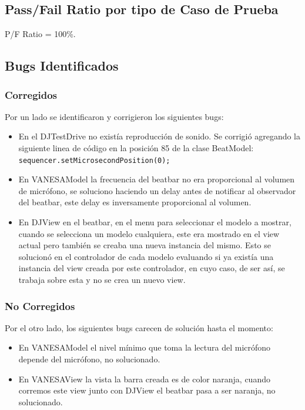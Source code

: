 \documentclass[10pt]{article} %
\begin{document}
\subsection{Pass/Fail Ratio por tipo de Caso de Prueba}
P/F Ratio = 100\%.

\subsection{Bugs Identificados}

\subsubsection{Corregidos}
Por un lado se identificaron y corrigieron los siguientes bugs:
\begin{itemize}
\item En el DJTestDrive no existía reproducción de sonido. Se corrigió agregando la siguiente linea de código en la posición 85 de la clase BeatModel:\\ 
\verb+sequencer.setMicrosecondPosition(0);+ 
\item En VANESAModel la frecuencia del beatbar no era proporcional al volumen de micrófono, se soluciono haciendo un delay antes de notificar al observador del beatbar, este delay es inversamente proporcional al volumen.
\item En DJView en el beatbar, en el menu para seleccionar el modelo a mostrar, cuando se selecciona un modelo cualquiera, este era mostrado en el view actual pero también se creaba una nueva instancia del mismo. Esto se solucionó en el controlador de cada modelo evaluando si ya existía una instancia del view creada por este controlador, en cuyo caso, de ser así, se trabaja sobre esta y no se crea un nuevo view.
\end{itemize}

\subsubsection{No Corregidos}
Por el otro lado, los siguientes bugs carecen de solución hasta el momento:
\begin{itemize}
\item En VANESAModel el nivel mínimo que toma la lectura del micrófono depende del micrófono, no solucionado.
\item En VANESAView la vista la barra creada es de color naranja, cuando corremos este view junto con DJView el beatbar pasa a ser naranja, no solucionado.
\end{itemize}
\end{document}
